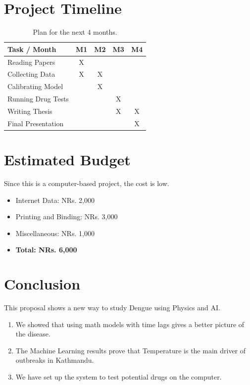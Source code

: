 \documentclass[12pt, a4paper]{article}
\begin{document}
\section{Project Timeline}

\begin{table}[H]
\centering
\renewcommand{\arraystretch}{1.5}
\begin{tabular}{|l|c|c|c|c|}
\hline
\textbf{Task / Month} & \textbf{M1} & \textbf{M2} & \textbf{M3} & \textbf{M4} \\ \hline
Reading Papers & X & & & \\ \hline
Collecting Data & X & X & & \\ \hline
Calibrating Model & & X & & \\ \hline
Running Drug Tests & & & X & \\ \hline
Writing Thesis & & & X & X \\ \hline
Final Presentation & & & & X \\ \hline
\end{tabular}
\caption{Plan for the next 4 months.}
\end{table}

\section{Estimated Budget}
Since this is a computer-based project, the cost is low.
\begin{itemize}
    \item Internet Data: NRs. 2,000
    \item Printing and Binding: NRs. 3,000
    \item Miscellaneous: NRs. 1,000
    \item \textbf{Total: NRs. 6,000}
\end{itemize}

\newpage

\section{Conclusion}

This proposal shows a new way to study Dengue using Physics and AI.
\begin{enumerate}
    \item We showed that using math models with time lags gives a better picture of the disease.
    \item The Machine Learning results prove that Temperature is the main driver of outbreaks in Kathmandu.
    \item We have set up the system to test potential drugs on the computer.
\end{enumerate}
\end{document}
